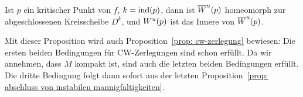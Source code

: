 \begin{prop}
    \label{prop: abschluss von instabilen mannigfaltigkeiten}
    Ist $p$ ein kritischer Punkt von $f$, $k = { \operatorname{ind} } (p)$, dann ist ${ \overline{W}^u } (p)$ homeomorph 
    zur abgeschlossenen Kreisscheibe $D^k$, und ${ W^u } (p)$ ist das Innere von ${ \overline{W}^u } (p)$.
\end{prop}

\begin{remark}
    Mit dieser Proposition wird auch Proposition~\ref{prop: cw-zerlegung} bewiesen:
    Die ersten beiden Bedingungen für CW-Zerlegungen sind schon erfüllt. Da wir annehmen, dass 
    $M$ kompakt ist, sind auch die letzten beiden Bedingungen erfüllt. Die dritte Bedingung folgt
    dann sofort aus der letzten Proposition~\ref{prop: abschluss von instabilen mannigfaltigkeiten}.
\end{remark}

